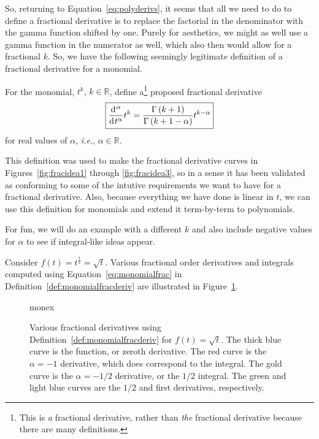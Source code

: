 So, returning to Equation~\ref{eq:polyderivs}, it seems that all we need to do
to define a fractional derivative is to replace the factorial in the denominator
with the gamma function shifted by one. Purely for aesthetics, we might as well
use a gamma function in the numerator as well, which also then would allow for a
fractional $k$. So, we have the following seemingly legitimate definition of a
fractional derivative for a monomial.

\begin{definition}
  For the monomial, $t^k$, $k \in \mathbb R$, define a\footnote{This is \emph{a} fractional derivative, rather than \emph{the} fractional derivative because there are many definitions. } proposed fractional derivative 
  \begin{equation}
	\boxed{
	\frac{\operatorname{d}\hspace*{-1pt}^\alpha}{\operatorname{d}\hspace*{-1pt} t^\alpha} t^k = \frac{\Gamma\left( k + 1 \right)}{\Gamma \left( k + 1 - \alpha \right)} t^{k - \alpha} }
	\label{eq:monomialfrac}
  \end{equation}
  for real values of $\alpha$, \textit{i.e.}, $\alpha \in \mathbb R$.
  \label{def:monomialfracderiv}
\end{definition}

This definition was used to make the fractional derivative curves in
Figures~\ref{fig:fracidea1} through \ref{fig:fracidea3}, so in a sense it has
been validated as conforming to some of the intutive requirements we want to
have for a fractional derivative. Also, because everything we have done is
linear in $t$, we can use this definition for monomials and extend it
term-by-term to polynomials. 

For fun, we will do an example with a different $k$ and also include negative
values for $\alpha$ to see if integral-like ideas appear.

\begin{example}
  Consider $f(t) = t^\frac{1}{2} = \sqrt{t}$. Various fractional order derivatives and integrals computed using Equation~\ref{eq:monomialfrac} in Definition~\ref{def:monomialfracderiv} are illustrated in Figure~\ref{fig:monex}.

  \begin{figure}
	\centering
	{monex}
	\caption{Various fractional derivatives using Definition~\ref{def:monomialfracderiv} for $f(t) = \sqrt{t}$. The thick blue curve is the function, or zeroth derivative. The red curve is the $\alpha = -1$ derivative, which does correspond to the integral. The gold curve is the $\alpha = -1/2$ derivative, or the $1/2$ integral. The green and light blue curves are the $1/2$ and first derivatives, respectively.} 
	\label{fig:monex}
  \end{figure}
\end{example}


